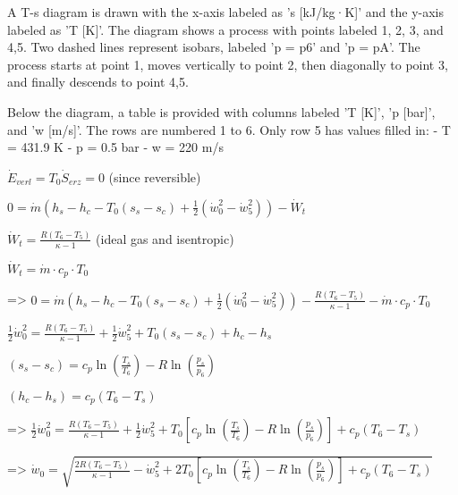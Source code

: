 A T-s diagram is drawn with the x-axis labeled as 's [kJ/kg·K]' and the y-axis labeled as 'T [K]'. The diagram shows a process with points labeled 1, 2, 3, and 4,5. Two dashed lines represent isobars, labeled 'p = p6' and 'p = pA'. The process starts at point 1, moves vertically to point 2, then diagonally to point 3, and finally descends to point 4,5.  

Below the diagram, a table is provided with columns labeled 'T [K]', 'p [bar]', and 'w [m/s]'. The rows are numbered 1 to 6. Only row 5 has values filled in:  
- T = 431.9 K  
- p = 0.5 bar  
- w = 220 m/s

\( \dot{E}_{verl} = T_0 \dot{S}_{erz} = 0 \) (since reversible)  

\( 0 = \dot{m} (h_s - h_c - T_0 (s_s - s_c) + \frac{1}{2} (\dot{w}_0^2 - \dot{w}_5^2)) - \dot{W}_t \)  

\( \dot{W}_t = \frac{R (T_6 - T_5)}{\kappa - 1} \) (ideal gas and isentropic)  

\( \dot{W}_t = \dot{m} \cdot c_p \cdot T_0 \)  

=> \( 0 = \dot{m} (h_s - h_c - T_0 (s_s - s_c) + \frac{1}{2} (\dot{w}_0^2 - \dot{w}_5^2)) - \frac{R (T_6 - T_5)}{\kappa - 1} - \dot{m} \cdot c_p \cdot T_0 \)  

\( \frac{1}{2} \dot{w}_0^2 = \frac{R (T_6 - T_5)}{\kappa - 1} + \frac{1}{2} \dot{w}_5^2 + T_0 (s_s - s_c) + h_c - h_s \)  

\( (s_s - s_c) = c_p \ln \left( \frac{T_s}{T_6} \right) - R \ln \left( \frac{p_s}{p_6} \right) \)  

\( (h_c - h_s) = c_p (T_6 - T_s) \)  

=> \( \frac{1}{2} \dot{w}_0^2 = \frac{R (T_6 - T_5)}{\kappa - 1} + \frac{1}{2} \dot{w}_5^2 + T_0 \left[ c_p \ln \left( \frac{T_s}{T_6} \right) - R \ln \left( \frac{p_s}{p_6} \right) \right] + c_p (T_6 - T_s) \)  

=> \( \dot{w}_0 = \sqrt{\frac{2 R (T_6 - T_5)}{\kappa - 1} - \dot{w}_5^2 + 2 T_0 \left[ c_p \ln \left( \frac{T_s}{T_6} \right) - R \ln \left( \frac{p_s}{p_6} \right) \right] + c_p (T_6 - T_s)} \)